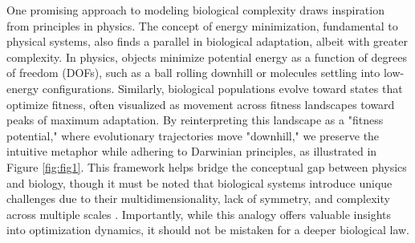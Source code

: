 \documentclass[11pt]{article}
\begin{document}
One promising approach to modeling biological complexity draws inspiration from principles in physics. The concept of energy minimization, fundamental to physical systems, also finds a parallel in biological adaptation, albeit with greater complexity. In physics, objects minimize potential energy as a function of degrees of freedom (DOFs), such as a ball rolling downhill or molecules settling into low-energy configurations. Similarly, biological populations evolve toward states that optimize fitness, often visualized as movement across fitness landscapes toward peaks of maximum adaptation. By reinterpreting this landscape as a "fitness potential," where evolutionary trajectories move "downhill," we preserve the intuitive metaphor while adhering to Darwinian principles, as illustrated in Figure \ref{fig:fig1}. This framework helps bridge the conceptual gap between physics and biology, though it must be noted that biological systems introduce unique challenges due to their multidimensionality, lack of symmetry, and complexity across multiple scales \cite{agozzino2020cells, sella2005application}. Importantly, while this analogy offers valuable insights into optimization dynamics, it should not be mistaken for a deeper biological law.
\end{document}
